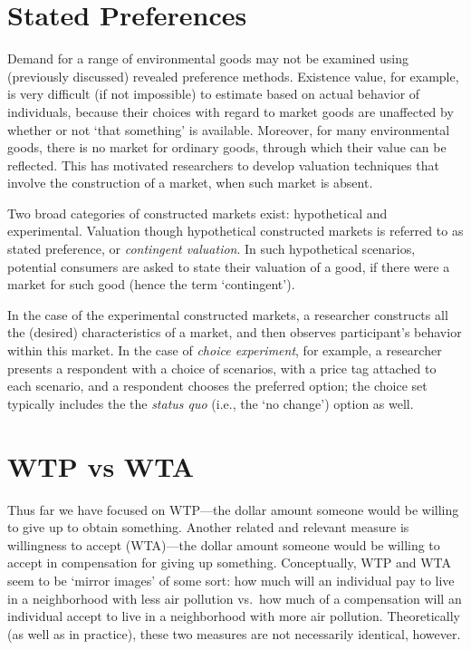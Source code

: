 \documentclass[
]{book}
\begin{document}
\hypertarget{stated-preferences}{%
\section{Stated Preferences}\label{stated-preferences}}

Demand for a range of environmental goods may not be examined using (previously discussed) revealed preference methods. Existence value, for example, is very difficult (if not impossible) to estimate based on actual behavior of individuals, because their choices with regard to market goods are unaffected by whether or not `that something' is available. Moreover, for many environmental goods, there is no market for ordinary goods, through which their value can be reflected. This has motivated researchers to develop valuation techniques that involve the construction of a market, when such market is absent.

Two broad categories of constructed markets exist: hypothetical and experimental. Valuation though hypothetical constructed markets is referred to as stated preference, or \emph{contingent valuation}. In such hypothetical scenarios, potential consumers are asked to state their valuation of a good, if there were a market for such good (hence the term `contingent').

In the case of the experimental constructed markets, a researcher constructs all the (desired) characteristics of a market, and then observes participant's behavior within this market. In the case of \emph{choice experiment}, for example, a researcher presents a respondent with a choice of scenarios, with a price tag attached to each scenario, and a respondent chooses the preferred option; the choice set typically includes the the \emph{status quo} (i.e., the `no change') option as well.

\hypertarget{wtp-vs-wta}{%
\section{WTP vs WTA}\label{wtp-vs-wta}}

Thus far we have focused on WTP---the dollar amount someone would be willing to give up to obtain something. Another related and relevant measure is willingness to accept (WTA)---the dollar amount someone would be willing to accept in compensation for giving up something.
Conceptually, WTP and WTA seem to be `mirror images' of some sort: how much will an individual pay to live in a neighborhood with less air pollution vs.~how much of a compensation will an individual accept to live in a neighborhood with more air pollution. Theoretically (as well as in practice), these two measures are not necessarily identical, however.
\end{document}
